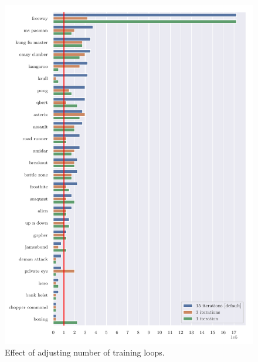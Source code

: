 \begin{figure}
\centering
\includegraphics[width=0.9\columnwidth]{figures/graph_Effect_of_adjusting_number_of_main_loop_iterations.pdf}
\caption{Effect of adjusting number of training loops.} 
\label{fig:adj_loops}
\end{figure}

